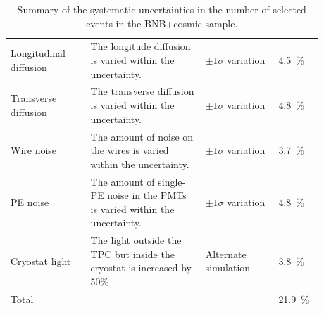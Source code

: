 \begin{table}[htbp]
{\begin{tabular}{p{0.23\linewidth}p{0.33\linewidth}p{0.21\linewidth}p{0.11\linewidth}}
     Longitudinal diffusion & The longitude diffusion is varied within the uncertainty. & $\pm1\sigma$ variation & 4.5~\%\\
     Transverse diffusion & The transverse diffusion is varied within the uncertainty. & $\pm1\sigma$ variation & 4.8~\%\\
     Wire noise & The amount of noise on the wires is varied within the uncertainty. & $\pm1\sigma$ variation & 3.7~\%\\
     PE noise & The amount of single-PE noise in the PMTs is varied within the uncertainty. & $\pm1\sigma$ variation & 4.8~\%\\
     Cryostat light & The light outside the TPC but inside the cryostat is increased by 50\% & Alternate simulation & 3.8~\%\\
     \midrule
     Total & & & 21.9~\%\\
     \bottomrule
   \end{tabular}
   \caption{Summary of the systematic uncertainties in the number of selected events in the BNB+cosmic sample.}\label{tab:syst}
}
\end{table}

